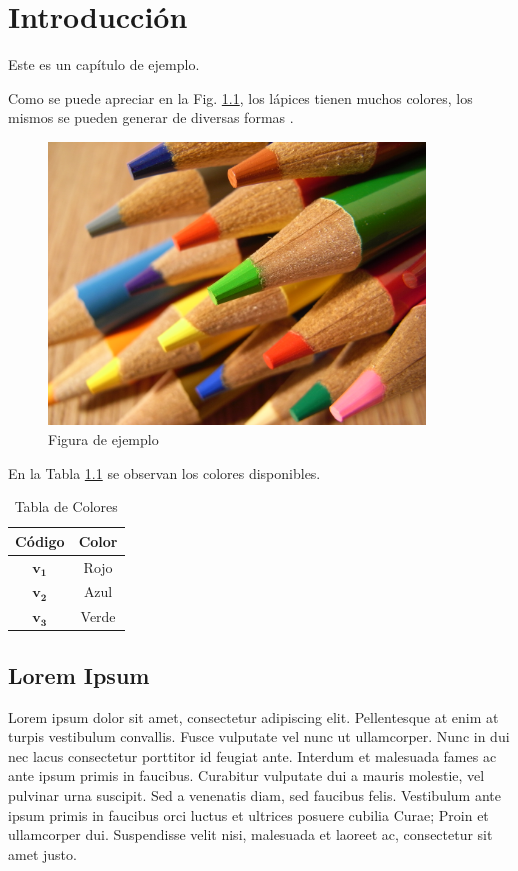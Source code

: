 \chapter{Introducción} \label{intro}
Este es un capítulo de ejemplo. 

Como se puede apreciar en la Fig. \ref{fig1_intro}, los lápices tienen muchos colores, los mismos se pueden generar de diversas formas \cite{ejemplo}.
\begin{figure}[htb]
	\centering
	\includegraphics[width=10cm]{figs/chapter1/sample.jpg}
	\caption{Figura de ejemplo}
	\label{fig1_intro}
\end{figure}

En la Tabla \ref{table1_intro} se observan los colores disponibles.
\begin{table}[htb]
\renewcommand{\arraystretch}{1.3}
	\caption{Tabla de Colores}
	\label{table1_intro}
	\centering
	\setlength\tabcolsep{2pt}
	\begin{tabular}{c c}
		\hline
		\bfseries Código & \bfseries Color\\
		\hline
		$\mathbf{v_1}$ & Rojo\\
		$\mathbf{v_2}$ & Azul\\
		$\mathbf{v_3}$ & Verde\\
		\hline
	\end{tabular}
\end{table}

\section{Lorem Ipsum}
Lorem ipsum dolor sit amet, consectetur adipiscing elit. Pellentesque at enim at turpis vestibulum convallis. Fusce vulputate vel nunc ut ullamcorper. Nunc in dui nec lacus consectetur porttitor id feugiat ante. Interdum et malesuada fames ac ante ipsum primis in faucibus. Curabitur vulputate dui a mauris molestie, vel pulvinar urna suscipit. Sed a venenatis diam, sed faucibus felis. Vestibulum ante ipsum primis in faucibus orci luctus et ultrices posuere cubilia Curae; Proin et ullamcorper dui. Suspendisse velit nisi, malesuada et laoreet ac, consectetur sit amet justo.

